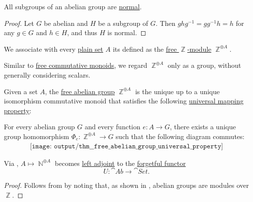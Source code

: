 \begin{proposition}\label{thm:abelian_normal_subgroups}
  All subgroups of an abelian group are \hyperref[def:normal_subgroup]{normal}.
\end{proposition}
\begin{proof}
  Let \( G \) be abelian and \( H \) be a subgroup of \( G \). Then \( g h g^{-1} = gg^{-1} h = h \) for any \( g \in G \) and \( h \in H \), and thus \( H \) is normal.
\end{proof}

\begin{definition}\label{def:free_abelian_group}\mimprovised
  We associate with every \hyperref[def:set]{plain set} \( A \) its  defined as the \hyperref[def:free_semimodule]{free \( \BbbZ \)-module} \( \BbbZ^{\oplus A} \).
\end{definition}
\begin{comments}
  \item Similar to \hyperref[def:free_commutative_monoid]{free commutative monoids}, we regard \( \BbbZ^{\oplus A} \) only as a group, without generally considering scalars.
\end{comments}

\begin{theorem}\label{thm:free_abelian_group_universal_property}
  Given a set \( A \), the \hyperref[def:free_abelian_group]{free abelian group} \( \BbbZ^{\oplus A} \) is the unique up to a unique isomorphism commutative monoid that satisfies the following \hyperref[rem:universal_mapping_property]{universal mapping property}:
  \begin{displayquote}
    For every abelian group \( G \) and every function \( e: A \to G \), there exists a unique group homomorphism \( \Phi_e: \BbbZ^{\oplus A} \to G \) such that the following diagram commutes:
    \begin{equation}\label{eq:thm:free_abelian_group_universal_property/diagram}
      \begin{aligned}
        \texttt{[image: output/thm\_\_free\_abelian\_group\_universal\_property]}
      \end{aligned}
    \end{equation}
  \end{displayquote}
\end{theorem}
\begin{comments}
  \item Via , \( A \mapsto \BbbN^{\oplus A} \) becomes \hyperref[def:category_adjunction]{left adjoint} to the \hyperref[def:concrete_category]{forgetful functor}
  \begin{equation*}
    U: \cat{Ab} \to \cat{Set}.
  \end{equation*}
\end{comments}
\begin{proof}
  Follows from  by noting that, as shown in , abelian groups are modules over \( \BbbZ \).
\end{proof}

